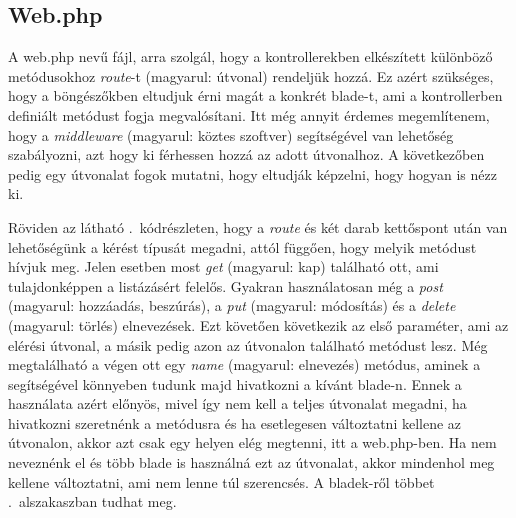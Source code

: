 \documentclass[]{thesis-ekf}
\theoremstyle{definition}
\theoremstyle{remark}
\begin{document}
	\subsection{Web.php}
		A web.php nevű fájl, arra szolgál, hogy a kontrollerekben elkészített különböző metódusokhoz \emph{route}-t (magyarul: útvonal) rendeljük hozzá. Ez azért szükséges, hogy a böngészőkben eltudjuk érni magát a konkrét blade-t, ami a kontrollerben definiált metódust fogja megvalósítani. Itt még annyit érdemes megemlítenem, hogy a \emph{middleware} (magyarul: köztes szoftver) segítségével van lehetőség szabályozni, azt hogy ki férhessen hozzá az adott útvonalhoz. A következőben pedig egy útvonalat fogok mutatni, hogy eltudják képzelni, hogy hogyan is nézz ki.
	
		
	
		Röviden az látható .~kódrészleten, hogy a \emph{route} és két darab kettőspont után van lehetőségünk a kérést típusát megadni, attól függően, hogy melyik metódust hívjuk meg. Jelen esetben most \emph{get} (magyarul: kap) található ott, ami tulajdonképpen a listázásért felelős. Gyakran használatosan még a \emph{post} (magyarul: hozzáadás, beszúrás), a \emph{put} (magyarul: módosítás) és a \emph{delete} (magyarul: törlés) elnevezések. Ezt követően következik az első paraméter, ami az elérési útvonal, a másik pedig azon az útvonalon található metódust lesz. Még megtalálható a végen ott egy \emph{name} (magyarul: elnevezés) metódus, aminek a segítségével könnyeben tudunk majd hivatkozni a kívánt blade-n. Ennek a használata azért előnyös, mivel így nem kell a teljes útvonalat megadni, ha hivatkozni szeretnénk a metódusra és ha esetlegesen változtatni kellene az útvonalon, akkor azt csak egy helyen elég megtenni, itt a web.php-ben. Ha nem neveznénk el és több blade is használná ezt az útvonalat, akkor mindenhol meg kellene változtatni, ami nem lenne túl szerencsés. A bladek-ről többet .~alszakaszban tudhat meg.
		
\end{document}
